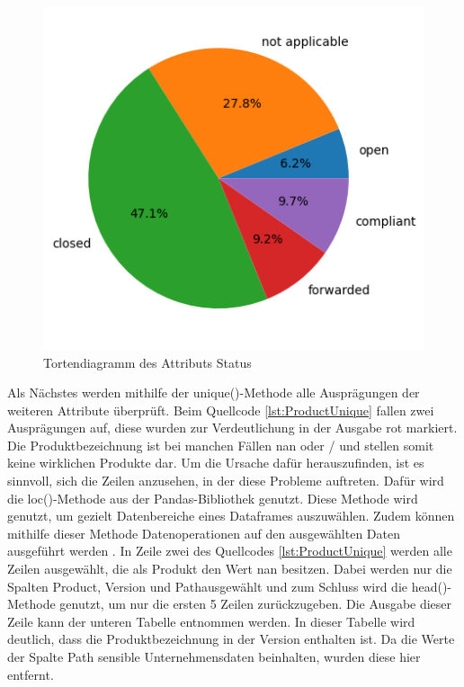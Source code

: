\begin{figure}[H]
    \centering
    \includegraphics[width = \textwidth/2]{abbildungen/Status.png}
    \caption{Tortendiagramm des Attributs Status}
    \label{fig:StatusPie}
\end{figure}

Als Nächstes werden mithilfe der unique()-Methode alle Ausprägungen der weiteren Attribute überprüft. Beim Quellcode \ref*{lst:ProductUnique} fallen zwei Ausprägungen
auf, diese wurden zur Verdeutlichung in der Ausgabe rot markiert. Die Produktbezeichnung ist bei manchen Fällen \glqq nan\grqq{} oder \glqq /\grqq{} und stellen somit
keine wirklichen Produkte dar. Um die Ursache dafür herauszufinden, ist es sinnvoll, sich die Zeilen anzusehen, in der diese Probleme auftreten. Dafür wird die
loc()-Methode aus der Pandas-Bibliothek genutzt. Diese Methode wird genutzt, um gezielt Datenbereiche eines Dataframes auszuwählen. Zudem können mithilfe dieser Methode
Datenoperationen auf den ausgewählten Daten ausgeführt werden \cite{PandasDoc}. In Zeile zwei des Quellcodes \ref*{lst:ProductUnique} werden alle Zeilen ausgewählt, die als Produkt
den Wert \glqq nan\grqq{} besitzen. Dabei werden nur die Spalten \glqq Product\grqq{}, \glqq Version\grqq{} und \glqq Path\grqq ausgewählt und zum Schluss
wird die head()-Methode genutzt, um nur die ersten 5 Zeilen zurückzugeben. Die Ausgabe dieser Zeile kann der unteren Tabelle entnommen werden.
In dieser Tabelle wird deutlich, dass die Produktbezeichnung in der Version enthalten ist. Da die Werte der Spalte \glqq Path\grqq{} sensible
Unternehmensdaten beinhalten, wurden diese hier entfernt.

